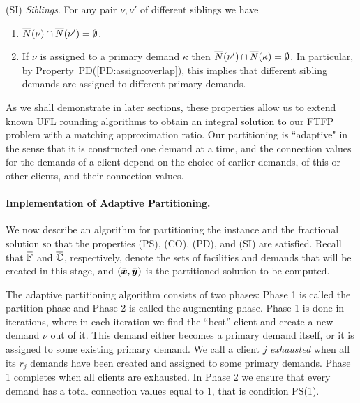 \documentclass[11pt]{article}
\begin{document}
\begin{description}
\begin{enumerate}
\begin{enumerate}
			\end{enumerate}

	\end{enumerate}
	
\item{(SI)} \emph{Siblings}. For any pair $\nu,\nu'$ of different siblings we have
  \begin{enumerate}

	\item \label{SI:siblings disjoint}
		  ${\overline{N}}(\nu)\cap {\overline{N}}(\nu') = \emptyset$.
		
	\item \label{SI:primary disjoint} If $\nu$ is assigned to a primary demand $\kappa$ then
 		${\overline{N}}(\nu')\cap {\overline{N}}(\kappa) = \emptyset$. In particular, by Property~PD(\ref{PD:assign:overlap}),
		this implies that different sibling demands are assigned to different primary demands.

	\end{enumerate}
	
\end{description}

As we shall demonstrate in later sections, these properties
allow us to extend known UFL rounding algorithms to obtain
an integral solution to our FTFP problem with a matching
approximation ratio. Our partitioning is ``adaptive" in the
sense that it is constructed one demand at a time, and the
connection values for the demands of a client depend on the choice of
earlier demands, of this or other clients, and their connection values.


\paragraph{Implementation of Adaptive Partitioning.}
We now describe an algorithm for partitioning the instance
and the fractional solution so that the properties (PS),
(CO), (PD), and (SI) are satisfied.  Recall that
$\overline{\mathbb{F}}$ and $\overline{\mathbb{C}}$, respectively, denote the
sets of facilities and demands that will be created in this
stage, and $(\bar{\boldsymbol{x}},\bar{\boldsymbol{y}})$ is the partitioned solution
to be computed. 

The adaptive partitioning algorithm consists of two phases:
Phase 1 is called the partition phase and Phase 2 is called
the augmenting phase. Phase 1 is done in iterations, where
in each iteration we find the ``best'' client and create a
new demand $\nu$ out of it. This demand either becomes a
primary demand itself, or it is assigned to some existing
primary demand. We call a client $j$ \emph{exhausted} when
all its $r_j$ demands have been created and assigned to some
primary demands. Phase 1 completes when all clients are
exhausted. In Phase 2 we ensure that every demand has a
total connection values equal to $1$, that is condition
PS(1).
\end{document}
